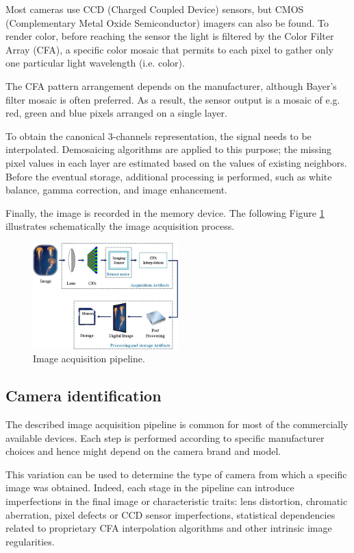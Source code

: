 \documentclass[a4paper, 11pt]{article}
\begin{document}
Most cameras use CCD (Charged Coupled Device) sensors, but CMOS (Complementary Metal Oxide Semiconductor) imagers can also be found. To render color, before reaching the sensor the light is filtered by the Color Filter Array (CFA), a specific color mosaic that permits to each pixel to gather only one particular light wavelength (i.e. color). 

The CFA pattern arrangement depends on the manufacturer, although Bayer’s filter mosaic is often preferred. As a result, the sensor output is a mosaic of e.g. red, green and blue pixels arranged on a single layer.

To obtain the canonical 3-channels representation, the signal needs to be interpolated. Demosaicing algorithms are applied to this purpose; the missing pixel values in each layer are estimated based on the values of existing neighbors. Before the eventual storage, additional processing is performed, such as white balance, gamma correction, and image enhancement.

Finally, the image is recorded in the memory device. The following Figure \ref{fig:imacq} illustrates schematically the image acquisition process.

\begin{figure}[H]
	\centering
	\includegraphics[width=0.5\textwidth]{imageacq}
	\caption{Image acquisition pipeline.}
	\label{fig:imacq}
\end{figure}

\subsection*{Camera identification}
The described image acquisition pipeline is common for most of the commercially
available devices. Each step is performed according to specific manufacturer
choices and hence might depend on the camera brand and model.

This variation can be used to determine the type of camera from which a specific image was obtained. Indeed, each stage in the pipeline can introduce imperfections in the final image or characteristic traits: lens distortion, chromatic aberration, pixel defects or CCD sensor imperfections, statistical dependencies related to proprietary CFA interpolation algorithms and other intrinsic image regularities.
\end{document}
